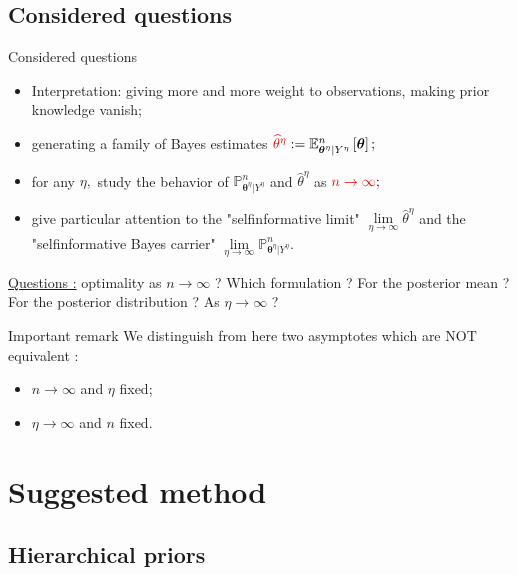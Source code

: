 \documentclass[10pt]{beamer}
\begin{document}
\subsection{Considered questions}
\begin{frame}{Considered questions}
\begin{itemize}
\setlength\itemsep{3em}
\item Interpretation: giving more and more weight to observations, making prior knowledge vanish;
\item generating a family of Bayes estimates $\textcolor{red!90!black}{\widehat{\theta}^{\eta}} := \mathbb{E}_{\boldsymbol{\theta}^{\eta} \vert Y^{\eta}}^{n} \left[\boldsymbol{\theta}\right];$
\item for any $\eta,$ study the behavior of $\mathbb{P}_{\boldsymbol{\theta}^{\eta} \vert Y^{\eta}}^{n}$ and $\widehat{\theta}^{\eta}$ as $\textcolor{red!90!black}{n \rightarrow \infty};$
\item give particular attention to the \textcolor{red!90!black}{"selfinformative limit"} $\lim\limits_{\eta \rightarrow \infty} \widehat{\theta}^{\eta}$ and the \textcolor{red!90!black}{"selfinformative Bayes carrier"}  $\lim\limits_{\eta \rightarrow \infty} \mathbb{P}_{\boldsymbol{\theta}^{\eta} \vert Y^{\eta}}^{n}$.
\end{itemize}

\underline{Questions :} optimality as $n \rightarrow \infty$ ?  Which formulation ? For the posterior mean ? For the posterior distribution ? As $\eta \rightarrow \infty$ ? 

\end{frame}

\begin{frame}{Important remark}
We distinguish from here two asymptotes which are NOT equivalent :
\begin{itemize}
\item $n \rightarrow \infty$ and $\eta$ fixed;
\item $\eta \rightarrow \infty$ and $n$ fixed.
\end{itemize}
\end{frame}

\section{Suggested method}
\subsection{Hierarchical priors}
\end{document}
